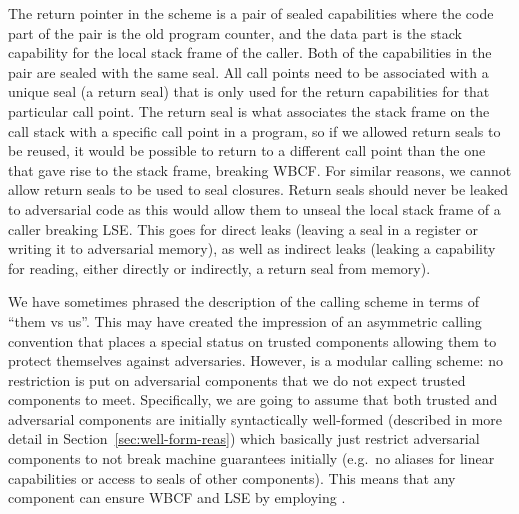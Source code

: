 \documentclass[acmsmall,screen]{acmart}\settopmatter{}
\begin{document}
The return pointer in the \stktokens{} scheme is a pair of sealed capabilities where the code part of the pair is the old program counter, and the data part is the stack capability for the local stack frame of the caller.
Both of the capabilities in the pair are sealed with the same seal.
All call points need to be associated with a unique seal (a return seal) that is only used for the return capabilities for that particular call point.
The return seal is what associates the stack frame on the call stack with a specific call point in a program, so if we allowed return seals to be reused, it would be possible to return to a different call point than the one that gave rise to the stack frame, breaking WBCF.
For similar reasons, we cannot allow return seals to be used to seal closures.
Return seals should never be leaked to adversarial code as this would allow them to unseal the local stack frame of a caller breaking LSE.
This goes for direct leaks (leaving a seal in a register or writing it to adversarial memory), as well as indirect leaks (leaking a capability for reading, either directly or indirectly, a return seal from memory).

We have sometimes phrased the description of the \stktokens{} calling scheme in terms of ``them vs us''.
This may have created the impression of an asymmetric calling convention that places a special status on trusted components allowing them to protect themselves against adversaries.
However, \stktokens{} is a modular calling scheme: no restriction is put on adversarial components that we do not expect trusted components to meet.
Specifically, we are going to assume that both trusted and adversarial components are initially syntactically well-formed (described in more detail in Section~\ref{sec:well-form-reas}) which basically just restrict adversarial components to not break machine guarantees initially (e.g.\ no aliases for linear capabilities or access to seals of other components).
This means that any component can ensure WBCF and LSE by employing \stktokens{}.

\end{document}
